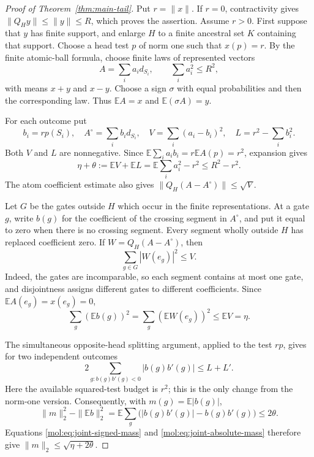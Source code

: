 \begin{proof}[Proof of Theorem~\ref{thm:main-tail}]
Put $r=\|x\|$. If $r=0$, contractivity gives
$\|Q_Hy\|\le\|y\|\le R$, which proves the assertion. Assume $r>0$.
First suppose that $y$ has finite support, and enlarge $H$ to a finite
ancestral set $K$ containing that support.  Choose a head test $p$ of
norm one such that $x(p)=r$.  By the finite atomic-ball formula, choose
finite laws of represented vectors
\[
 A=\sum_i a_i d_{S_i},\qquad \sum_i a_i^2\le R^2,
\]
with means $x+y$ and $x-y$.  Choose a sign $\sigma$ with equal
probabilities and then the corresponding law.  Thus
$\mathbb EA=x$ and $\mathbb E(\sigma A)=y$.

For each outcome put
\[
 b_i=r p(S_i),\quad
 A^\circ=\sum_i b_i d_{S_i},\quad
 V=\sum_i(a_i-b_i)^2,\quad
 L=r^2-\sum_i b_i^2.
\]
Both $V$ and $L$ are nonnegative.  Since
$\mathbb E\sum_i a_i b_i=r\mathbb EA(p)=r^2$, expansion gives
\begin{equation}\label{mol:eq:joint-identity}
 \eta+\theta
 :=\mathbb EV+\mathbb EL
 =\mathbb E\sum_i a_i^2-r^2
 \le R^2-r^2.
\end{equation}
The atom coefficient estimate also gives
$\|Q_H(A-A^\circ)\|\le\sqrt V$.

Let $G$ be the gates outside $H$ which occur in the finite
representations.  At a gate $g$, write $b(g)$ for the coefficient of the
crossing segment in $A^\circ$, and put it equal to zero when there is
no crossing segment.  Every segment wholly outside $H$ has replaced
coefficient zero.  If $W=Q_H(A-A^\circ)$, then
\[
 \sum_{g\in G}|W(e_g)|^2\le V.
\]
Indeed, the gates are incomparable, so each segment contains at most
one gate, and disjointness assigns different gates to different
coefficients.  Since $\mathbb EA(e_g)=x(e_g)=0$,
\begin{equation}\label{mol:eq:joint-signed-mass}
 \sum_g(\mathbb Eb(g))^2
 =\sum_g(\mathbb EW(e_g))^2\le\mathbb EV=\eta.
\end{equation}

The simultaneous opposite-head splitting argument, applied to the
test $rp$, gives for two independent outcomes
\[
 2\sum_{g:b(g)b'(g)<0}|b(g)b'(g)|\le L+L'.
\]
Here the available squared-test budget is $r^2$; this is the only
change from the norm-one version.  Consequently, with
$m(g)=\mathbb E|b(g)|$,
\begin{equation}\label{mol:eq:joint-absolute-mass}
 \|m\|_2^2-\|\mathbb Eb\|_2^2
 =\mathbb E\sum_g\bigl(|b(g)b'(g)|-b(g)b'(g)\bigr)
 \le2\theta.
\end{equation}
Equations \eqref{mol:eq:joint-signed-mass} and
\eqref{mol:eq:joint-absolute-mass} therefore give
$\|m\|_2\le\sqrt{\eta+2\theta}$.


\end{proof}
